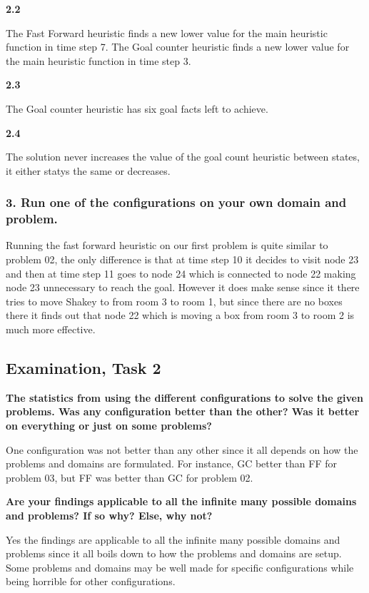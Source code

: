 \documentclass[a4paper,10pt]{article}
\begin{document}
\textbf{2.2}

The Fast Forward heuristic finds a new lower value for the main heuristic function in time step 7.
The Goal counter heuristic finds a new lower value for the main heuristic function in time step 3.

\textbf{2.3}

The Goal counter heuristic has six goal facts left to achieve.

\textbf{2.4}

The solution never increases the value of the goal count heuristic between states, it either statys 
the same or decreases.

\subsubsection*{3. Run one of the configurations on your own domain and problem.}

Running the fast forward heuristic on our first problem is quite similar to problem 02,
the only difference is that at time step 10 it decides to visit node 23 and then at time step 11 goes to node 24 which is connected to node 22 making node 23 unnecessary to reach the goal.
However it does make sense since it there tries to move Shakey to from room 3 to room 1, but since there are no boxes there it finds out that node 22 which is moving a box from room 3 to room 2 is much more effective.

\subsection*{Examination, Task 2}

\textbf{The statistics from using the different configurations to solve the given problems. Was any configuration better than the other? Was it better on everything or just on some problems?}

One configuration was not better than any other since it all depends on how the problems and 
domains are formulated. For instance, GC better than FF for problem 03, but FF was better than
GC for problem 02.

\textbf{Are your findings applicable to all the infinite many possible domains and problems? If so why? Else, why not? }

Yes the findings are applicable to all the infinite many possible domains and problems since it all boils down to how the problems and domains are setup. Some problems and domains may be well made for
specific configurations while being horrible for other configurations.
\end{document}
